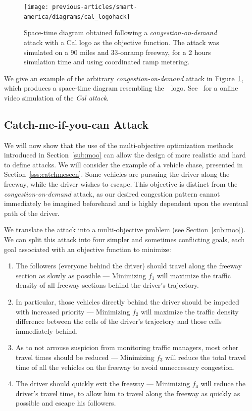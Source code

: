 \begin{figure}[ht]
\centering
  \texttt{[image: previous-articles/smart-america/diagrams/cal\_logohack]}
\caption{Space-time diagram obtained following a \emph{congestion-on-demand} attack with a Cal logo as the objective function. The attack was simulated on a 90 miles and 33-onramp freeway, for a 2 hours simulation time and using coordinated ramp metering.}
\label{fig:cal_logo}
\end{figure}

We give an example of the arbitrary \emph{congestion-on-demand} attack in Figure~\ref{fig:cal_logo}, which produces a space-time diagram resembling the~~logo. See~\cite{smartroadswebsite} for a online video simulation of the \emph{Cal attack}.

\subsection{Catch-me-if-you-can Attack}
\label{sub:catchme}
We will now show that the use of the multi-objective optimization methods introduced in Section~\ref{sub:moo} can allow the design of more realistic and hard to define attacks. We will consider the example of a vehicle chase, presented in Section~\ref{sss:catchmescen}. Some vehicles are pursuing the driver along the freeway, while the driver wishes to escape. This objective is distinct from the \emph{congestion-on-demand} attack, as our desired congestion pattern cannot immediately be imagined beforehand and is highly dependent upon the eventual path of the driver.

We translate the attack into a multi-objective problem (see Section~\ref{sub:moo}). We can split this attack into four simpler and sometimes conflicting goals, each goal associated with an objective function to minimize:

\begin{enumerate}
\item The followers (everyone behind the driver) should travel along the freeway section as slowly as possible --- Minimizing $f_1$ will maximize the traffic density of all freeway sections behind the driver's trajectory.

\item In particular, those vehicles directly behind the driver should be impeded with increased priority --- Minimizing $f_2$ will maximize the traffic density difference between the cells of the driver's trajectory and those cells immediately behind.
\item As to not arrouse suspicion from monitoring traffic managers, most other travel times should be reduced --- Minimizing $f_3$ will reduce the total travel time of all the vehicles on the freeway to avoid unneccessary congestion.
\item The driver should quickly exit the freeway --- Minimizing $f_4$ will reduce the driver's travel time, to allow him to travel along the freeway as quickly as possible and escape his followers.
\end{enumerate}


